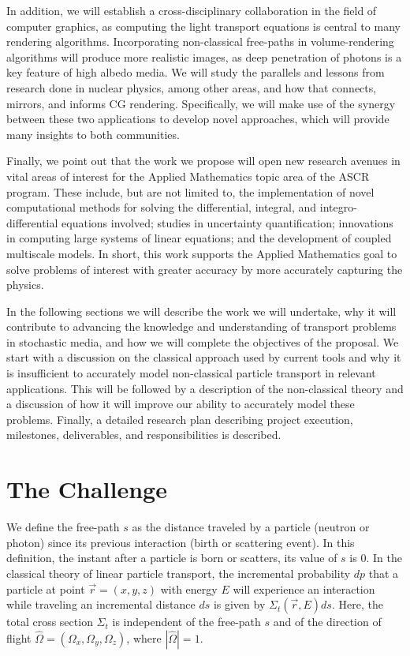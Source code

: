 \documentclass[12pt]{article}
\newcommand{\rvec}{\ensuremath{\vec{r}}}
\newcommand{\omvec}{\ensuremath{\hat{\Omega}}}
\begin{document}
In addition, we will establish a cross-disciplinary collaboration in the field of computer graphics, as computing the light transport equations is central to many rendering algorithms.
Incorporating non-classical free-paths in volume-rendering algorithms will produce more realistic images, as deep penetration of photons is a key feature of high albedo media.
We will study the parallels and lessons from research done in nuclear physics, among other areas, and how that connects, mirrors, and informs CG rendering.
Specifically, we will make use of the synergy between these two applications to develop novel approaches, which will provide many insights to both communities.

Finally, we point out that the work we propose will open new research avenues in vital areas of interest for the Applied Mathematics topic area of the ASCR program.
These include, but are not limited to, the implementation of novel computational methods for solving the differential, integral, and integro-differential equations involved; studies in uncertainty quantification; innovations in computing large systems of linear equations; and the development of coupled multiscale models.
In short, this work supports the Applied Mathematics goal to solve problems of interest with greater accuracy by more accurately capturing the physics.

In the following sections we will describe the work we will undertake, why it will contribute to advancing the knowledge and understanding of transport problems in stochastic media, and how we will complete the objectives of the proposal.
We start with a discussion on the classical approach used by current tools and why it is insufficient to accurately model non-classical particle transport in relevant applications.
This will be followed by a description of the non-classical theory and a discussion of
how it will improve our ability to accurately model these problems.
Finally, a detailed research plan describing project execution, milestones, deliverables, and responsibilities is described.

\section{The Challenge}

We define the free-path $s$ as the distance traveled by a particle (neutron or photon) since its previous interaction (birth or scattering event).
In this definition, the instant after a particle is born or scatters, its value of $s$ is 0.
In the classical theory of linear particle transport, the incremental probability $dp$ that a particle at point $\rvec = (x,y,z)$ with energy $E$ will experience an interaction while traveling an incremental distance $ds$ is given by $\Sigma_t(\rvec,E)ds$.
Here, the total cross section $\Sigma_t$ is independent of the free-path $s$ and of the direction of flight $\omvec = (\Omega_x,\Omega_y,\Omega_z)$, where $|\omvec|=1$.
\end{document}
